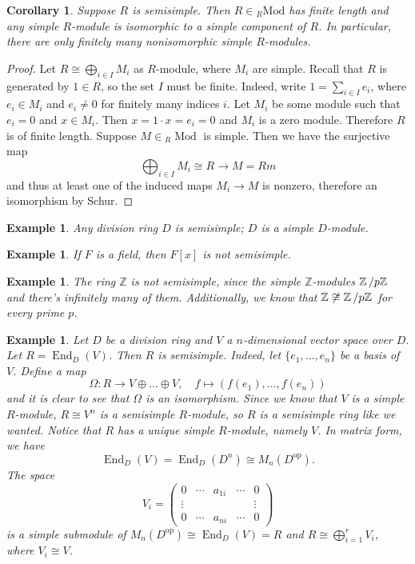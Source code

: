 \documentclass[10pt, a4paper]{article}
\newtheorem{corollary}[thm]{Corollary}
\newtheorem{example}[thm]{Example}
\newenvironment{noticeC}{%
  \tcolorbox[%
  notitle,
  empty,
  enhanced,  %
  breakable,
  coltext=black, 
  fontupper=\rmfamily,
  noparskip,
  sharp corners,
  boxrule=-1pt,  %
  frame hidden,
  left=7pt,  %
  right=7pt,
  top=5pt,
  bottom=5pt,
  before skip=2.5ex plus 2pt,
  after skip=2.5ex plus 2pt,
  overlay unbroken and last={%
  },
  ]}
{\endtcolorbox}
\newenvironment{myproof}%
  {\begin{noticeC}\begin{proof}}%
  {\end{proof}\end{noticeC}}
\newcommand{\Z}{\mathbb {Z}}
\newcommand{\quot}[2]{{\raisebox{0em}{$#1$}\left/\raisebox{0em}{$#2$}\right.}}
\DeclareMathOperator{\en}{End}
\DeclareMathOperator{\mo}{Mod}
\begin{document}
\begin{corollary}
  Suppose $R$ is semisimple. Then $R \in {}_R \mathrm{Mod}$ has finite length
  and any simple $R$-module is isomorphic to a simple component of $R$.
  In particular, there are only finitely many nonisomorphic simple $R$-modules.
\end{corollary}

\begin{myproof}
  Let $R \cong \bigoplus_{i \in I} M_i$ as $R$-module, where $M_i$ are simple.
  Recall that $R$ is generated by $1 \in R$, so the set $I$ must be finite.
  Indeed, write $1 = \sum_{i \in I} e_i$, where $e_i \in M_i$ and $e_i \neq 0$ for finitely many indices $i$.
  Let $M_i$ be some module such that $e_i = 0$ and $x \in M_i.$ Then $x = 1 \cdot x = e_i = 0$ and $M_i$ is a zero module.
  Therefore $R$ is of finite length.
  Suppose $M \in {}_R \mo$ is simple. Then we have the surjective map 
  $$\bigoplus_{i \in I} M_i \cong R \rightarrow M = Rm$$
  and thus at least one of the induced maps $M_i \to M$ is nonzero, therefore an isomorphism by Schur.
\end{myproof}

\begin{example}
    Any division ring $D$ is semisimple; $D$ is a simple $D$-module.
\end{example}

\begin{example}
  If $F$ is a field, then $F[x]$ is not semisimple. 
\end{example}

\begin{example}
  The ring $\Z$ is not semisimple, since the simple $\Z$-modules $\quot{\Z}{p\Z}$
    and there's infinitely many of them. Additionally, we know that $\Z \not\cong \quot{\Z}{p\Z}$
    for every prime $p$.
\end{example}

\begin{example}
    Let $D$ be a division ring and $V$ a $n$-dimensional vector space over $D$.
    Let $R = \en_D (V)$. Then $R$ is semisimple. Indeed, let $\{e_1, \dots, e_n\}$
    be a basis of $V$. Define a map 
    $$\Omega: R \to V \oplus \dots \oplus V,\quad f \mapsto (f(e_1), \dots, f(e_n))$$
    and it is clear to see that $\Omega$ is an isomorphism. Since we know that $V$ is 
    a simple $R$-module, $R \cong V^n$ is a semisimple $R$-module, so $R$ is a semisimple ring like we wanted.
    Notice that $R$ has a unique simple $R$-module, namely $V$.
    In matrix form, we have 
    $$\en_D (V) = \en_D (D^n) \cong M_n (D^{\mathrm{op}}).$$
    The space 
    $$V_i = \begin{pmatrix}
      0 & \cdots & a_{1i} & \cdots & 0\\
      \vdots &&&& \vdots\\
      0 & \cdots & a_{ni} & \cdots & 0
    \end{pmatrix}$$
    is a simple submodule of $M_n(D^{\mathrm{op}}) \cong \en_D (V) = R$ and $R \cong \bigoplus_{i = 1} ^r V_i$,
    where $V_i \cong V$.
\end{example}
\end{document}
